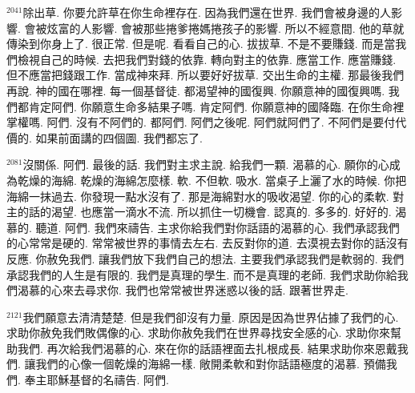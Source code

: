 \documentclass{book}
\begin{document}
$^{2041}$除出草.
你要允許草在你生命裡存在.
因為我們還在世界.
我們會被身邊的人影響.
會被炫富的人影響.
會被那些捲爹捲媽捲孩子的影響.
所以不經意間.
他的草就傳染到你身上了.
很正常.
但是呢.
看看自己的心.
拔拔草.
不是不要賺錢.
而是當我們檢視自己的時候.
去把我們對錢的依靠.
轉向對主的依靠.
應當工作.
應當賺錢.
但不應當把錢跟工作.
當成神來拜.
所以要好好拔草.
交出生命的主權.
那最後我們再說.
神的國在哪裡.
每一個基督徒.
都渴望神的國復興.
你願意神的國復興嗎.
我們都肯定阿們.
你願意生命多結果子嗎.
肯定阿們.
你願意神的國降臨.
在你生命裡掌權嗎.
阿們.
沒有不阿們的.
都阿們.
阿們之後呢.
阿們就阿們了.
不阿們是要付代價的.
如果前面講的四個圖.
我們都忘了.

$^{2081}$沒關係.
阿們.
最後的話.
我們對主求主說.
給我們一顆.
渴慕的心.
願你的心成為乾燥的海綿.
乾燥的海綿怎麼樣.
軟.
不但軟.
吸水.
當桌子上灑了水的時候.
你把海綿一抹過去.
你發現一點水沒有了.
那是海綿對水的吸收渴望.
你的心的柔軟.
對主的話的渴望.
也應當一滴水不流.
所以抓住一切機會.
認真的.
多多的.
好好的.
渴慕的.
聽道.
阿們.
我們來禱告.
主求你給我們對你話語的渴慕的心.
我們承認我們的心常常是硬的.
常常被世界的事情去左右.
去反對你的道.
去漠視去對你的話沒有反應.
你赦免我們.
讓我們放下我們自己的想法.
主要我們承認我們是軟弱的.
我們承認我們的人生是有限的.
我們是真理的學生.
而不是真理的老師.
我們求助你給我們渴慕的心來去尋求你.
我們也常常被世界迷惑以後的話.
跟著世界走.

$^{2121}$我們願意去清清楚楚.
但是我們卻沒有力量.
原因是因為世界佔據了我們的心.
求助你赦免我們敗偶像的心.
求助你赦免我們在世界尋找安全感的心.
求助你來幫助我們.
再次給我們渴慕的心.
來在你的話語裡面去扎根成長.
結果求助你來恩戴我們.
讓我們的心像一個乾燥的海綿一樣.
敞開柔軟和對你話語極度的渴慕.
預備我們.
奉主耶穌基督的名禱告.
阿們.
\newpage
\end{document}
